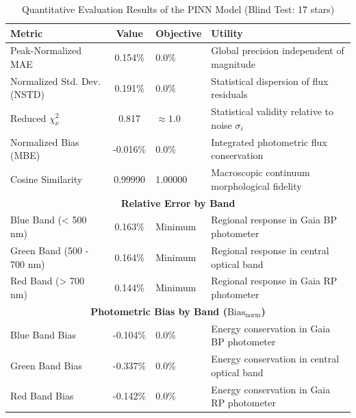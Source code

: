 
\begin{table}[htpb]
\centering
\caption{Quantitative Evaluation Results of the PINN Model (Blind Test: 17 stars)}
\label{tab:pinn_evaluation}
\begin{tabular}{lcll}
\hline
\textbf{Metric} & \textbf{Value} & \textbf{Objective} & \textbf{Utility} \\
\hline
Peak-Normalized MAE & 0.154\% & 0.0\% & Global precision independent of magnitude \\
Normalized Std. Dev. (NSTD) & 0.191\% & 0.0\% & Statistical dispersion of flux residuals \\
Reduced $\chi^2_\nu$ & 0.817 & $\approx 1.0$ & Statistical validity relative to noise $\sigma_i$ \\
Normalized Bias (MBE) & -0.016\% & 0.0\% & Integrated photometric flux conservation \\
Cosine Similarity & 0.99990 & 1.00000 & Macroscopic continuum morphological fidelity \\
\hline
\multicolumn{4}{c}{\textbf{Relative Error by Band}} \\
\hline
Blue Band (< 500 nm) & 0.163\% & Minimum & Regional response in Gaia BP photometer \\
Green Band (500 - 700 nm) & 0.164\% & Minimum & Regional response in central optical band \\
Red Band (> 700 nm) & 0.144\% & Minimum & Regional response in Gaia RP photometer \\
\hline
\multicolumn{4}{c}{\textbf{Photometric Bias by Band ($\text{Bias}_{\text{norm}}$)}} \\
\hline
Blue Band Bias & -0.104\% & 0.0\% & Energy conservation in Gaia BP photometer \\
Green Band Bias & -0.337\% & 0.0\% & Energy conservation in central optical band \\
Red Band Bias & -0.142\% & 0.0\% & Energy conservation in Gaia RP photometer \\
\hline
\end{tabular}
\end{table}
